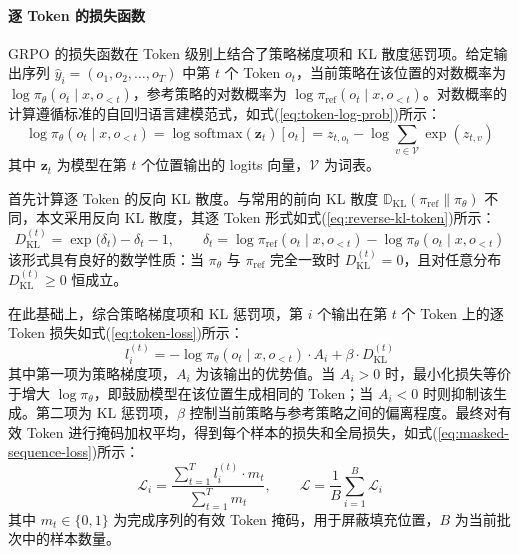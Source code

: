 \paragraph{逐 Token 的损失函数}

GRPO 的损失函数在 Token 级别上结合了策略梯度项和 KL 散度惩罚项。给定输出序列 $\hat{y}_i = (o_1, o_2, \dots, o_T)$ 中第 $t$ 个 Token $o_t$，当前策略在该位置的对数概率为 $\log \pi_\theta(o_t \mid x, o_{<t})$，参考策略的对数概率为 $\log \pi_{\text{ref}}(o_t \mid x, o_{<t})$。对数概率的计算遵循标准的自回归语言建模范式，如式(\ref{eq:token-log-prob})所示：
\begin{equation}\label{eq:token-log-prob}
  \log \pi_\theta(o_t \mid x, o_{<t}) = \log \text{softmax}(\mathbf{z}_t)[o_t] = z_{t,o_t} - \log\sum_{v \in \mathcal{V}} \exp(z_{t,v})
\end{equation}
其中 $\mathbf{z}_t$ 为模型在第 $t$ 个位置输出的 logits 向量，$\mathcal{V}$ 为词表。

首先计算逐 Token 的反向 KL 散度。与常用的前向 KL 散度 $\mathbb{D}_{\text{KL}}(\pi_{\text{ref}} \| \pi_\theta)$ 不同，本文采用反向 KL 散度，其逐 Token 形式如式(\ref{eq:reverse-kl-token})所示：
\begin{equation}\label{eq:reverse-kl-token}
  D_{\text{KL}}^{(t)} = \exp\!\big(\delta_t\big) - \delta_t - 1, \qquad
  \delta_t = \log \pi_{\text{ref}}(o_t \mid x, o_{<t}) - \log \pi_\theta(o_t \mid x, o_{<t})
\end{equation}
该形式具有良好的数学性质：当 $\pi_\theta$ 与 $\pi_{\text{ref}}$ 完全一致时 $D_{\text{KL}}^{(t)} = 0$，且对任意分布 $D_{\text{KL}}^{(t)} \geq 0$ 恒成立。

在此基础上，综合策略梯度项和 KL 惩罚项，第 $i$ 个输出在第 $t$ 个 Token 上的逐 Token 损失如式(\ref{eq:token-loss})所示：
\begin{equation}\label{eq:token-loss}
  l_i^{(t)} = -\log \pi_\theta(o_t \mid x, o_{<t}) \cdot A_i + \beta \cdot D_{\text{KL}}^{(t)}
\end{equation}
其中第一项为策略梯度项，$A_i$ 为该输出的优势值。当 $A_i > 0$ 时，最小化损失等价于增大 $\log \pi_\theta$，即鼓励模型在该位置生成相同的 Token；当 $A_i < 0$ 时则抑制该生成。第二项为 KL 惩罚项，$\beta$ 控制当前策略与参考策略之间的偏离程度。最终对有效 Token 进行掩码加权平均，得到每个样本的损失和全局损失，如式(\ref{eq:masked-sequence-loss})所示：
\begin{equation}\label{eq:masked-sequence-loss}
  \mathcal{L}_i = \frac{\sum_{t=1}^{T} l_i^{(t)} \cdot m_t}{\sum_{t=1}^{T} m_t}, \qquad
  \mathcal{L} = \frac{1}{B}\sum_{i=1}^{B} \mathcal{L}_i
\end{equation}
其中 $m_t \in \{0, 1\}$ 为完成序列的有效 Token 掩码，用于屏蔽填充位置，$B$ 为当前批次中的样本数量。

